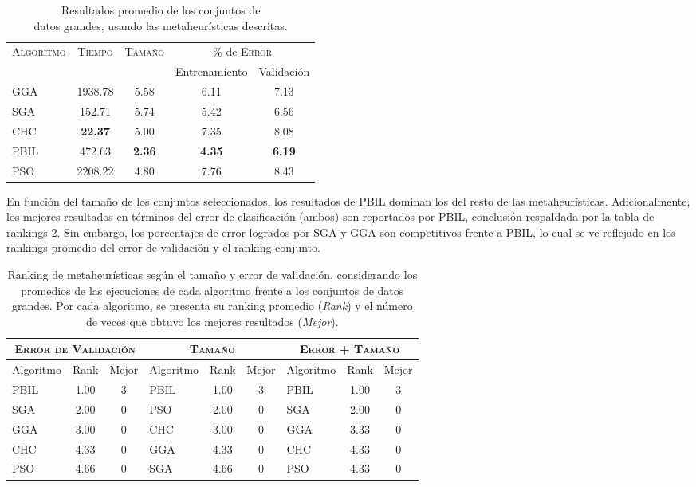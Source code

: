 \begin{table}[h!]
\centering
\begin{tabular}{l c c c c}
\hline
\multirow{2}{*}{\textsc{Algoritmo}}
	& \multirow{2}{*}{\textsc{Tiempo}}
	& \multirow{2}{*}{\textsc{Tamaño}}
	& \multicolumn{2}{c}{$\%$ de \textsc{Error}} \\\cline{4-5}
 & & & \scriptsize{Entrenamiento} & \scriptsize{Validación} \\
\hline
\hline
GGA  & 1938.78 & 5.58 & 6.11 & 7.13 \\
SGA  &  152.71 & 5.74 & 5.42 & 6.56 \\
CHC  & \textbf{22.37} & 5.00 & 7.35 & 8.08 \\
PBIL &  472.63 & \textbf{2.36} & \textbf{4.35} & \textbf{6.19} \\
PSO  & 2208.22 & 4.80 & 7.76 & 8.43 \\
\hline
\end{tabular}
\caption[Resultados de metaheurísticas usando conjuntos de datos grandes]{Resultados promedio de los conjuntos de\\datos grandes, usando las metaheurísticas descritas.}
\label{res-big}
\end{table}

En función del tamaño de los conjuntos seleccionados, los resultados de PBIL dominan los del resto de las metaheurísticas. Adicionalmente, los mejores resultados en términos del error de clasificación (ambos) son reportados por PBIL, conclusión respaldada por la tabla de rankings \ref{res-big-rank}. Sin embargo, los porcentajes de error logrados por SGA y GGA son competitivos frente a PBIL, lo cual se ve reflejado en los rankings promedio del error de validación y el ranking conjunto.

\begin{table}[h!]
\centering
\begin{tabular}{l c c|l c c|l c c}
\hline
\multicolumn{3}{c|}{\textsc{Error de Validación}}
	& \multicolumn{3}{c|}{\textsc{Tamaño}}
	& \multicolumn{3}{c}{\textsc{Error + Tamaño}} \\
\hline
Algoritmo & Rank & Mejor & Algoritmo & Rank & Mejor & Algoritmo & Rank & Mejor \\
\hline
\hline
PBIL & 1.00 & 3 & PBIL & 1.00 & 3 & PBIL & 1.00 & 3 \\
SGA  & 2.00 & 0 & PSO  & 2.00 & 0 & SGA  & 2.00 & 0 \\
GGA  & 3.00 & 0 & CHC  & 3.00 & 0 & GGA  & 3.33 & 0 \\
CHC  & 4.33 & 0 & GGA  & 4.33 & 0 & CHC  & 4.33 & 0 \\
PSO  & 4.66 & 0 & SGA  & 4.66 & 0 & PSO  & 4.33 & 0 \\
\hline
\end{tabular}
\caption[Ranking  de metaheurísticas usando conjuntos de datos grandes]{Ranking de metaheurísticas según el tamaño y error de validación, considerando los promedios de las ejecuciones de cada algoritmo frente a los conjuntos de datos grandes. Por cada algoritmo, se presenta su ranking promedio (\emph{Rank}) y el número de veces que obtuvo los mejores resultados (\emph{Mejor}).}
\label{res-big-rank}
\end{table}

